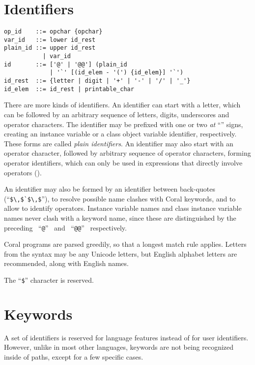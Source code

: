 \newpage






\section{Identifiers}
\label{sec:identifiers}

\syntax\begin{lstlisting}
op_id    ::= opchar {opchar}
var_id   ::= lower id_rest
plain_id ::= upper id_rest
           | var_id
id       ::= ['@' | '@@'] (plain_id
             | '`' [(id_elem - '(') {id_elem}] '`')
id_rest  ::= {letter | digit | '+' | '-' | '/' | '_'}
id_elem  ::= id_rest | printable_char
\end{lstlisting}

There are more kinds of identifiers. An identifier can start with a letter, which can be followed by an arbitrary sequence of letters, digits, underscores and operator characters. The identifier may be prefixed with one or two {\em at} ``'' signs, creating an instance variable or a class object variable identifier, respectively. These forms are called {\em plain identifiers}. An identifier may also start with an operator character, followed by arbitrary sequence of operator characters, forming operator identifiers, which can only be used in expressions that directly involve operators (). 

An identifier may also be formed by an identifier between back-quotes (``\lstinline!$\,$`$\,$!''), to resolve possible name clashes with Coral keywords, and to allow to identify operators. Instance variable names and class instance variable names never clash with a keyword name, since these are distinguished by the preceding ~``\lstinline!@!''~ and ~``\lstinline!@@!''~ respectively. 

Coral programs are parsed greedily, so that a longest match rule applies. Letters from the syntax may be any Unicode letters, but English alphabet letters are recommended, along with English names.

The ``\lstinline[mathescape=false]!$!'' character is reserved. 






\section{Keywords}\label{sec:keywords}

A set of identifiers is reserved for language features instead of for user identifiers. However, unlike in most other languages, keywords are not being recognized inside of paths, except for a few specific cases.

